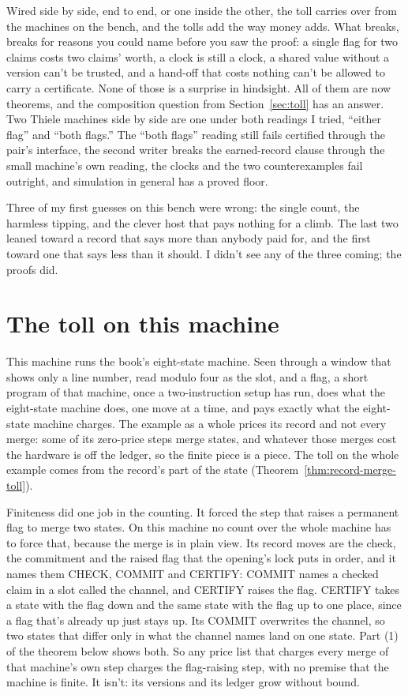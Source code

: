 \documentclass[11pt,twoside]{article}
\theoremstyle{thielethm}
\theoremstyle{thieledef}
\theoremstyle{thieledef}
\theoremstyle{thieledef}
\theoremstyle{thielethm}
\theoremstyle{thieleobs}
\theoremstyle{thielethm}
\begin{document}
Wired side by side, end to end, or one inside the other, the toll carries over from the machines on
the bench, and the tolls add the way money adds. What breaks, breaks for reasons you could name before
you saw the proof: a single flag for two claims costs two claims' worth, a clock is still a clock, a
shared value without a version can't be trusted, and a hand-off that costs nothing can't be allowed to carry a
certificate. None of those is a surprise in hindsight. All of them are now theorems, and the
composition question from Section~\ref{sec:toll} has an answer. Two Thiele machines side by
side are one under both readings I tried, ``either flag'' and ``both flags.'' The ``both flags''
reading still fails certified through the pair's interface, the second writer breaks the earned-record clause through the small machine's own reading, the clocks and the two counterexamples fail outright, and simulation in
general has a proved floor.

Three of my first guesses on this bench were wrong: the single count, the harmless tipping, and the
clever host that pays nothing for a climb. The last two leaned toward a record that says more than anybody paid for,
and the first toward one that says less than it should. I didn't see any of the three coming; the
proofs did.



\section{The toll on this machine}

This machine runs the book's eight-state machine. Seen through a window that shows only a line
number, read modulo four as the slot, and a flag, a short program of that machine, once a
two-instruction setup has run, does what the
eight-state machine does, one move at a time, and pays exactly what the eight-state machine charges. The example as a
whole prices its record and not every merge: some of its zero-price steps merge states, and
whatever those merges cost the hardware is off the ledger, so the finite piece is a piece. The toll on
the whole example comes from the record's part of the state (Theorem~\ref{thm:record-merge-toll}).

Finiteness did one job in the counting. It forced the step that raises a permanent flag to merge two
states. On this machine no count over the whole machine has to force that, because the
merge is in plain view.
Its record moves are the check, the commitment and the raised flag that the opening's lock puts in
order, and it names them CHECK, COMMIT and CERTIFY: COMMIT names a
checked claim in a slot called the channel, and CERTIFY raises the flag. CERTIFY takes a state with the flag down and the same state with the flag up to one place,
since a flag that's already up just stays up. Its COMMIT overwrites the channel, so two states that
differ only in what the channel names land on one state. Part (1) of the theorem below shows
both. So any price list that
charges every merge of that machine's own step charges the flag-raising step, with no premise that
the machine is finite. It isn't: its versions and its ledger grow without bound.
\end{document}
